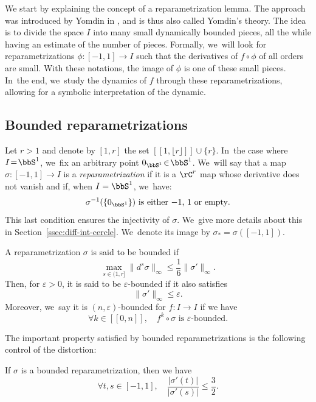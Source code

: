We start by explaining the concept of a reparametrization lemma.
The approach was introduced by Yomdin in \cite{Yomdin1987VolumeGA}, and is thus also called Yomdin's theory.
The idea is to divide the space $I$ into many small dynamically bounded pieces, all the while having an estimate of the number of pieces.
Formally, we~will look for reparametrizations $\phi : [-1, 1] \to I$ such that the derivatives of $f \circ \phi$ of all orders are small. With these notations, the image of $\phi$ is one of these small pieces. In~the end, we~study the dynamics of $f$ through these reparametrizations, allowing for a symbolic interpretation of the dynamic.

\subsection{Bounded reparametrizations}
\label{ssec:reparam-bornee}

Let $r \!>\! 1$ and denote by $[1, r]$ the set \hbox{$[ \! [ 1, \lfloor r \rfloor ] \! ] \cup \{ r \}$}. In~the case where $I \!=\! \bbS^1$, we~fix an arbitrary point $0_{\bbS^1} \!\in\! \bbS^1$. We~will say that a map $\sigma : [-1, 1] \to I$ is a \textit{reparametrization} if it is a $\rC^r$ map whose derivative does not vanish and if, when $I = \bbS^1$, we~have:
\begin{align*}
\sigma^{-1} (\{ 0_{\bbS^1} \}) \text{ is either $-1$, $1$ or empty}.
\end{align*}
This last condition ensures the injectivity of $\sigma$. We~give more details about this in Section~\ref{ssec:diff-int-cercle}. We~denote its image by $\sigma_* = \sigma([-1, 1])$.

\begin{definition}
A reparametrization $\sigma$ is said to be bounded if
\[
\max_{s \in (1, r]}\| d^s \sigma \|_{\infty} \leq \frac{1}{6} \| \sigma' \|_{\infty}.
\]
Then, for $\varepsilon > 0$, it is said to be $\varepsilon$-bounded if it also satisfies
\[
\| \sigma' \|_{\infty} \le \varepsilon.
\]
Moreover, we~say it is $(n, \varepsilon)$-bounded for $f : I \to I$ if we have
\[
\forall k \in [ \! [ 0, n ] \! ],\quad f^k \circ \sigma \text{ is } \varepsilon \text{-bounded}.
\]
\end{definition}

The important property satisfied by bounded reparametrizations is the following control of the distortion:

\begin{lem}
\label{lem:distortion}
If $\sigma$ is a bounded reparametrization, then we have
\[
\forall t,s \in [-1, 1],\quad \frac{| \sigma'(t) |}{|\sigma'(s)|} \leq \frac{3}{2}.
\]
\end{lem}

